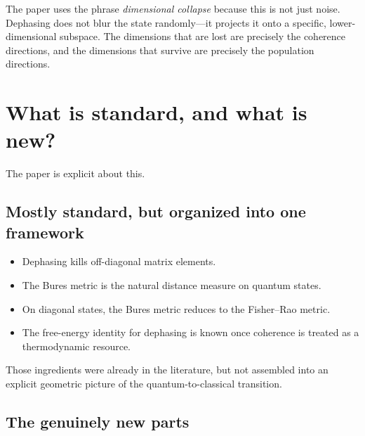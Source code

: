 \documentclass[11pt,a4paper]{article}
\begin{document}
The paper uses the phrase \emph{dimensional collapse} because this is not just noise.  Dephasing does not blur the state randomly---it projects it onto a specific, lower-dimensional subspace.  The dimensions that are lost are precisely the coherence directions, and the dimensions that survive are precisely the population directions.

\section*{What is standard, and what is new?}

The paper is explicit about this.

\subsection*{Mostly standard, but organized into one framework}

\begin{itemize}[leftmargin=1.5em]
\item Dephasing kills off-diagonal matrix elements.
\item The Bures metric is the natural distance measure on quantum states.
\item On diagonal states, the Bures metric reduces to the Fisher--Rao metric.
\item The free-energy identity for dephasing is known once coherence is treated as a thermodynamic resource.
\end{itemize}

Those ingredients were already in the literature, but not assembled into an explicit geometric picture of the quantum-to-classical transition.

\subsection*{The genuinely new parts}
\end{document}
